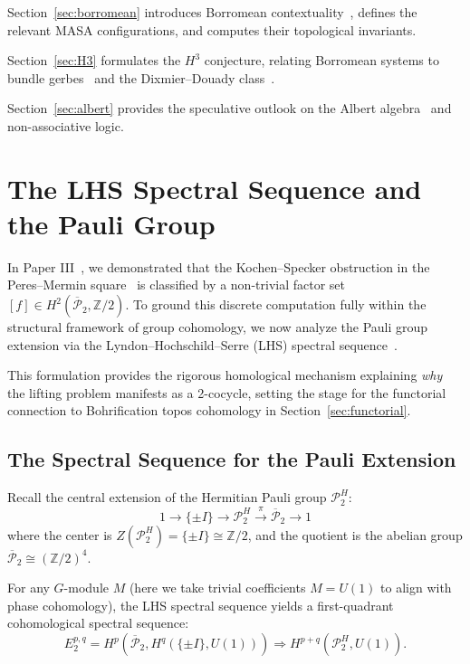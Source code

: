 \documentclass[11pt]{article}
\begin{document}
Section~\ref{sec:borromean} introduces Borromean contextuality~\cite{Rolfsen76}, defines the relevant MASA configurations, and computes their topological invariants.

Section~\ref{sec:H3} formulates the $H^3$ conjecture, relating Borromean systems to bundle gerbes~\cite{Murray96,Brylinski93} and the Dixmier--Douady class~\cite{DD63}.

Section~\ref{sec:albert} provides the speculative outlook on the Albert algebra~\cite{Jacobson68,Baez02,Conway03} and non-associative logic.

\section{The LHS Spectral Sequence and the Pauli Group}
\label{sec:LHS}

In Paper III~\cite{PaperIII}, we demonstrated that the Kochen--Specker obstruction in the Peres--Mermin square~\cite{Peres90,Mermin90} is classified by a non-trivial factor set $[f] \in H^2(\overline{\mathcal{P}}_2, \mathbb{Z}/2)$. To ground this discrete computation fully within the structural framework of group cohomology, we now analyze the Pauli group extension via the Lyndon--Hochschild--Serre (LHS) spectral sequence~\cite{HS53}.

This formulation provides the rigorous homological mechanism explaining \emph{why} the lifting problem manifests as a 2-cocycle, setting the stage for the functorial connection to Bohrification topos cohomology in Section~\ref{sec:functorial}.

\subsection{The Spectral Sequence for the Pauli Extension}

Recall the central extension of the Hermitian Pauli group $\mathcal{P}_2^H$:
\[
    1 \longrightarrow \{\pm I\} \longrightarrow \mathcal{P}_2^H \overset{\pi}{\longrightarrow} \overline{\mathcal{P}}_2 \longrightarrow 1
\]
where the center is $Z(\mathcal{P}_2^H) = \{\pm I\} \cong \mathbb{Z}/2$, and the quotient is the abelian group $\overline{\mathcal{P}}_2 \cong (\mathbb{Z}/2)^4$.

For any $G$-module $M$ (here we take trivial coefficients $M = U(1)$ to align with phase cohomology), the LHS spectral sequence yields a first-quadrant cohomological spectral sequence:
\[
    E_2^{p,q} = H^p(\overline{\mathcal{P}}_2, H^q(\{\pm I\}, U(1))) \Longrightarrow H^{p+q}(\mathcal{P}_2^H, U(1)).
\]
\end{document}
